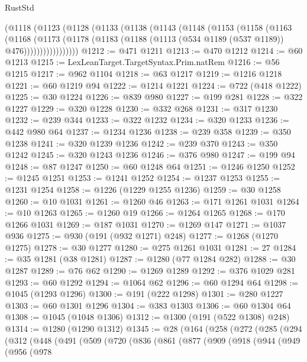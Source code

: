 \begin{lexlean}{RustStd}
\begin{coremodule}
      (@1118
        (@1123
          (@1128
            (@1133
              (@1138
                (@1143
                  (@1148
                    (@1153
                      (@1158
                        (@1163
                          (@1168
                            (@1173
                              (@1178
                                (@1183 (@1188 (@1113 (@534 @1189 (@537 @1189)) @476)))))))))))))))))
@1212 := @471 @1211
@1213 := @470 @1212
@1214 := @60 @1213
@1215 := LexLeanTarget.TargetSyntax.Prim.natRem
@1216 := @56 @1215
@1217 := @962 @1104
@1218 := @63 @1217
@1219 := @1216 @1218
@1221 := @60 @1219 @94
@1222 := @1214 @1221
@1224 := @722 (@418 @1222)
@1225 := @30 @1224
@1226 := @839 @980
@1227 := @199 @281
@1228 := @322 @1227
@1229 := @320 @1228
@1230 := @332 @268
@1231 := @317 @1230
@1232 := @239 @344
@1233 := @322 @1232
@1234 := @320 @1233
@1236 := @442 @980 @64
@1237 := @1234 @1236
@1238 := @239 @358
@1239 := @350 @1238
@1241 := @320 @1239 @1236
@1242 := @239 @370
@1243 := @350 @1242
@1245 := @320 @1243 @1236
@1246 := @376 @980
@1247 := @199 @94
@1248 := @87 @1247
@1250 := @60 @1248 @64
@1251 := @1246 @1250
@1252 := @1245 @1251
@1253 := @1241 @1252
@1254 := @1237 @1253
@1255 := @1231 @1254
@1258 := @1226 (@1229 @1255 @1236)
@1259 := @30 @1258
@1260 := @10 @1031
@1261 := @1260 @46
@1263 := @171 @1261 @1031
@1264 := @10 @1263
@1265 := @1260 @19
@1266 := @1264 @1265
@1268 := @170 @1266 @1031
@1269 := @187 @1031
@1270 := @1269 @147
@1271 := @1037 @936
@1275 := @930 (@191 (@932 @1271) @248)
@1277 := @1268 (@1270 @1275)
@1278 := @30 @1277
@1280 := @275 @1261 @1031
@1281 := 27
@1284 := @35 @1281 (@38 @1281)
@1287 := @1280 (@77 @1284 @282)
@1288 := @30 @1287
@1289 := @76 @62
@1290 := @1269 @1289
@1292 := @376 @1029 @281
@1293 := @60 @1292
@1294 := @1064 @62
@1296 := @60 @1294 @64
@1298 := @1045 (@1293 @1296)
@1300 := @191 (@222 @1298)
@1301 := @280 @1227
@1303 := @60 @1301 @1296
@1304 := @383 @1303
@1306 := @60 @1304 @64
@1308 := @1045 (@1048 @1306)
@1312 := @1300 (@191 (@522 @1308) @248)
@1314 := @1280 (@1290 @1312)
@1345 := @28
    (@164
      (@258
        (@272
          (@285
            (@294
              (@312
                (@448
                  (@491
                    (@509
                      (@720
                        (@836
                          (@861
                            (@877
                              (@909
                                (@918
                                  (@944
                                    (@949
                                      (@956
                                        (@978

\end{coremodule}
\end{lexlean}
